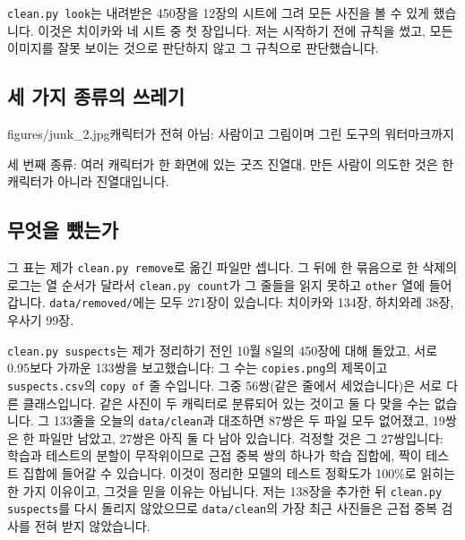 \documentclass[11pt]{article}
\begin{document}

\texttt{clean.py look}는 내려받은 450장을 12장의 시트에 그려 모든 사진을 볼 수
있게 했습니다. 이것은 치이카와 네 시트 중 첫 장입니다. 저는 시작하기 전에
규칙을 썼고, 모든 이미지를 잘못 보이는 것으로 판단하지 않고 그 규칙으로
판단했습니다.

\subsection*{세 가지 종류의 쓰레기}
           {figures/junk_2.jpg}{캐릭터가 전혀 아님: 사람이고 그림이며 그린
도구의 워터마크까지}


세 번째 종류: 여러 캐릭터가 한 화면에 있는 굿즈 진열대. 만든 사람이 의도한
것은 한 캐릭터가 아니라 진열대입니다.

\subsection*{무엇을 뺐는가}

그 표는 제가 \texttt{clean.py remove}로 옮긴 파일만 셉니다. 그 뒤에 한
묶음으로 한 삭제의 로그는 열 순서가 달라서 \texttt{clean.py count}가 그 줄들을
읽지 못하고 \texttt{other} 열에 들어갑니다. \texttt{data/removed/}에는 모두 271장이
있습니다: 치이카와 134장, 하치와레 38장, 우사기 99장.


\texttt{clean.py suspects}는 제가 정리하기 전인 10월 8일의 450장에 대해 돌았고,
서로 0.95보다 가까운 133쌍을 보고했습니다: 그 수는 \texttt{copies.png}의
제목이고 \texttt{suspects.csv}의 \texttt{copy of} 줄 수입니다. 그중 56쌍(같은
줄에서 세었습니다)은 서로 다른 클래스입니다. 같은 사진이 두 캐릭터로 분류되어
있는 것이고 둘 다 맞을 수는 없습니다. 그 133줄을 오늘의 \texttt{data/clean}과
대조하면 87쌍은 두 파일 모두 없어졌고, 19쌍은 한 파일만 남았고, 27쌍은 아직
둘 다 남아 있습니다. 걱정할 것은 그 27쌍입니다: 학습과 테스트의 분할이
무작위이므로 근접 중복 쌍의 하나가 학습 집합에, 짝이 테스트 집합에 들어갈 수
있습니다. 이것이 정리한 모델의 테스트 정확도가 100\%로 읽히는 한 가지
이유이고, 그것을 믿을 이유는 아닙니다. 저는 138장을 추가한 뒤
\texttt{clean.py suspects}를 다시 돌리지 않았으므로 \texttt{data/clean}의 가장
최근 사진들은 근접 중복 검사를 전혀 받지 않았습니다.
\end{document}

